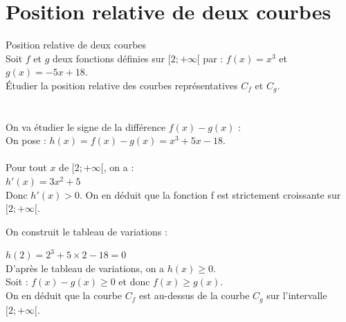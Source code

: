 \section{Position relative de deux courbes}
\begin{bmethodet}{Position relative de deux courbes}
    \\
    Soit $f$ et $g$ deux fonctions définies sur $[2 ; +\infty [$ par : $f(x)=x^3$ et $g(x)=-5x+18$.\\
    Étudier la position relative des courbes représentatives $C_f$ et $C_g$.\\
    \ \\
    \\
    On va étudier le signe de la différence $f(x)-g(x)$ :\\
    On pose : $h(x)=f(x)-g(x)=x^3+5x-18$.\\
     \\
    Pour tout $x$ de $[2 ; +\infty [$, on a : \\
    $h'(x)=3x^2+5$\\
    Donc  $h'(x)>0$.
    On en déduit que la fonction f est strictement croissante sur $[2 ; +\infty [$.
    
    On construit le tableau de variations :\\
    \begin{center}
    \end{center}
    
    $h(2)=2^3+5\times 2-18=0$\\
    D'après le tableau de variations, on a $h(x)\geq 0$.\\
    Soit : $f(x)-g(x)\geq 0$ et donc  $f(x)\geq g(x)$.\\ 
    On en déduit que la courbe $C_f$ est au-dessus de la courbe $C_g$ sur l'intervalle $[2 ; +\infty [$.
\end{bmethodet}
